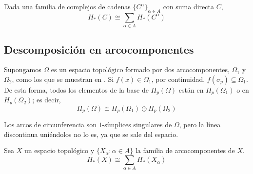\begin{lemma}
Dada una familia de complejos de cadenas $\{C^\alpha\}_{\alpha \in A}$ con suma
directa $C$,
\[H_*(C)\cong\sum_{\alpha \in A}H_*(C^\alpha)\]
\end{lemma}

\subsection{Descomposición en arcocomponentes}
Supongamos $\Omega$ es un espacio topológico formado por dos arcocomponentes,
$\Omega_1$ y $\Omega_2$, como los que se muestran en . Si
$f(x) \in \Omega_1$, por continuidad, $f(\sigma_p) \subseteq \Omega_1$. De esta
forma, todos los elementos de la base de $H_p(\Omega)$ están en $H_p(\Omega_1)$ o
en $H_p(\Omega_2)$; es decir,
\[H_p(\Omega)\cong H_p(\Omega_1)\oplus H_p(\Omega_2)\]

\begin{marginfigure}

\caption[Dos espacios arcoconexos, cada uno conteniendo la imagen de un
símplice singular, junto con una línea discontinua que sale de uno de ellos
para entrar en el otro.]{Los arcos de circunferencia son
$1$-símplices singulares de $\Omega$, pero la línea discontinua uniéndolos no
lo es, ya que se sale del espacio.}
\end{marginfigure}

\begin{proposition}
 Sea $X$ un espacio topológico y $\{X_\alpha\colon \alpha
\in A\}$ la familia de arcocomponentes de $X$.
\[H_*(X) \cong \sum_{\alpha \in A} H_*(X_\alpha)\]
\end{proposition}


